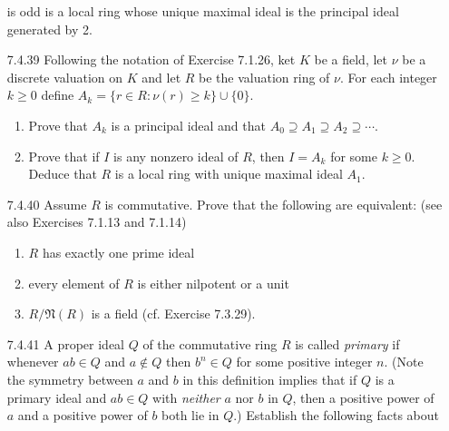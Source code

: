 \begin{enumerate}
                  is odd is a local ring whose unique maximal ideal is the
                  principal ideal generated by 2.
   \item[7.4.39]  Following the notation of Exercise 7.1.26, ket $K$ be a field,
                  let $\nu$ be a discrete valuation on $K$ and let $R$ be the
                  valuation ring of $\nu$. For each integer $k \ge 0$ define
                  $A_k = \{r \in R : \nu(r) \ge k\} \cup \{0\}$.
                  \begin{enumerate}
                     \item Prove that $A_k$ is a principal ideal and that
                           $A_0 \supseteq A_1 \supseteq A_2 \supseteq \cdots$.
                     \item Prove that if $I$ is any nonzero ideal of $R$, then
                           $I = A_k$ for some $k \ge 0$. Deduce that $R$ is a
                           local ring with unique maximal ideal $A_1$.
                  \end{enumerate}
   \item[7.4.40]  Assume $R$ is commutative. Prove that the following are
                  equivalent: (see also Exercises 7.1.13 and 7.1.14)
                  \begin{enumerate}\renewcommand{\labelenumii}{(\roman{enumii})}
                     \item $R$ has exactly one prime ideal
                     \item every element of $R$ is either nilpotent or a unit
                     \item $R/\mathfrak{N}(R)$ is a field (cf. Exercise 7.3.29).
                  \end{enumerate}
   \item[7.4.41]  A proper ideal $Q$ of the commutative ring $R$ is called
                  \textit{primary} if whenever $ab \in Q$ and $a \notin Q$ then
                  $b^n \in Q$ for some positive integer $n$. (Note the symmetry
                  between $a$ and $b$ in this definition implies that if $Q$ is
                  a primary ideal and $ab \in Q$ with \textit{neither} $a$ nor
                  $b$ in $Q$, then a positive power of $a$ and a positive power
                  of $b$ both lie in $Q$.) Establish the following facts about

\end{enumerate}
